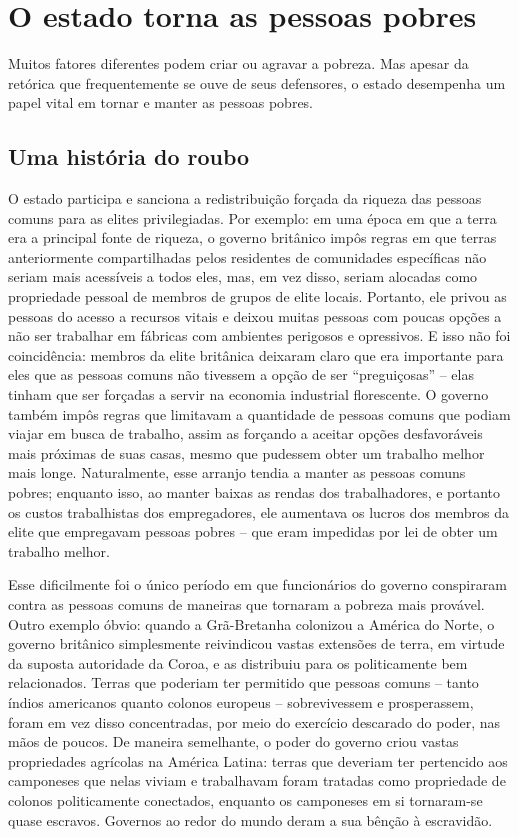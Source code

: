 \section{O estado torna as pessoas pobres}
\label{sec:1}

Muitos fatores diferentes podem criar ou agravar a pobreza. Mas apesar da retórica que frequentemente se ouve de seus defensores, o estado desempenha um papel vital em tornar e manter as pessoas pobres.

\subsection*{Uma história do roubo}

O estado participa e sanciona a redistribuição forçada da riqueza das pessoas comuns para as elites privilegiadas. Por exemplo: em uma época em que a terra era a principal fonte de riqueza, o governo britânico impôs regras em que terras anteriormente compartilhadas pelos residentes de comunidades específicas não seriam mais acessíveis a todos eles, mas, em vez disso, seriam alocadas como propriedade pessoal de membros de grupos de elite locais. Portanto, ele privou as pessoas do acesso a recursos vitais e deixou muitas pessoas com poucas opções a não ser trabalhar em fábricas com ambientes perigosos e opressivos. E isso não foi coincidência: membros da elite britânica deixaram claro que era importante para eles que as pessoas comuns não tivessem a opção de ser ``preguiçosas'' -- elas tinham que ser forçadas a servir na economia industrial florescente. O governo também impôs regras que limitavam a quantidade de pessoas comuns que podiam viajar em busca de trabalho, assim as forçando a aceitar opções desfavoráveis mais próximas de suas casas, mesmo que pudessem obter um trabalho melhor mais longe. Naturalmente, esse arranjo tendia a manter as pessoas comuns pobres; enquanto isso, ao manter baixas as rendas dos trabalhadores, e portanto os custos trabalhistas dos empregadores, ele aumentava os lucros dos membros da elite que empregavam pessoas pobres -- que eram impedidas por lei de obter um trabalho melhor.

Esse dificilmente foi o único período em que funcionários do governo conspiraram contra as pessoas comuns de maneiras que tornaram a pobreza mais provável. Outro exemplo óbvio: quando a Grã-Bretanha colonizou a América do Norte, o governo britânico simplesmente reivindicou vastas extensões de terra, em virtude da suposta autoridade da Coroa, e as distribuiu para os politicamente bem relacionados. Terras que poderiam ter permitido que pessoas comuns -- tanto índios americanos quanto colonos europeus -- sobrevivessem e prosperassem, foram em vez disso concentradas, por meio do exercício descarado do poder, nas mãos de poucos. De maneira semelhante, o poder do governo criou vastas propriedades agrícolas na América Latina: terras que deveriam ter pertencido aos camponeses que nelas viviam e trabalhavam foram tratadas como propriedade de colonos politicamente conectados, enquanto os camponeses em si tornaram-se quase escravos. Governos ao redor do mundo deram a sua bênção à escravidão.

